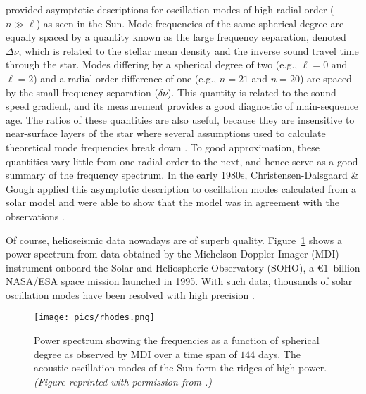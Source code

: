 \citet{1980ApJS...43..469T} provided asymptotic descriptions for oscillation modes of high radial order (${n\gg\ell}$) as seen in the Sun. 
Mode frequencies of the same spherical degree are equally spaced by a quantity known as the large frequency separation, denoted ${\Delta\nu}$, which is related to the stellar mean density and the inverse sound travel time through the star. 
Modes differing by a spherical degree of two (e.g., ${\ell=0}$ and ${\ell=2}$) and a radial order difference of one (e.g., ${n=21}$ and ${n=20}$) are spaced by the small frequency separation (${\delta\nu}$). 
This quantity is related to the sound-speed gradient, and its measurement provides a good diagnostic of main-sequence age. 
The ratios of these quantities are also useful, because they are insensitive to near-surface layers of the star where several assumptions used to calculate theoretical mode frequencies break down \citep[e.g.,][]{2003A&A...411..215R}. 
To good approximation, these quantities vary little from one radial order to the next, and hence serve as a good summary of the frequency spectrum. 
In the early 1980s, Christensen-Dalsgaard \& Gough applied this asymptotic description to oscillation modes calculated from a solar model and were able to show that the model was in agreement with the observations \citep[e.g.,][]{2002RvMP...74.1073C}. 

Of course, helioseismic data nowadays are of superb quality. 
Figure~\ref{fig:rhodes-mdi} shows a power spectrum from data obtained by the Michelson Doppler Imager (MDI) instrument onboard the Solar and Heliospheric Observatory (SOHO), a \euro$1$~billion NASA/ESA space mission launched in 1995. 
With such data, thousands of solar oscillation modes have been resolved with high precision \citep[e.g.,][]{1997SoPh..175..287R}. 

\begin{figure}
    \centering
    \texttt{[image: pics/rhodes.png]}
    \caption[Solar power spectrum from MDI]{Power spectrum showing the frequencies as a function of spherical degree as observed by MDI over a time span of $144$ days. 
    The acoustic oscillation modes of the Sun form the ridges of high power. 
        \emph{(Figure reprinted with permission from \citealt{1997SoPh..175..287R}.)}
        \label{fig:rhodes-mdi}}
\end{figure}


